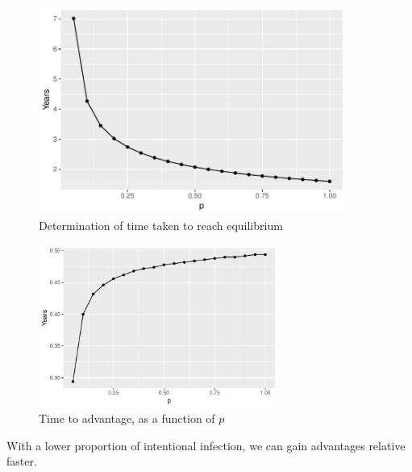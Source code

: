 \documentclass[12pt]{beamer}
\begin{document}
\begin{frame}
\begin{figure}[h]
  \centering
  \includegraphics[width=0.9\textwidth]{Figures/Time_to_EE_plot.pdf}
  \caption{Determination of time taken to reach equilibrium}
\end{figure}
\end{frame}
\begin{frame}
\begin{figure}[H]
  \centering
  \includegraphics[width=0.7\textwidth]{Figures/Time_to_advantage_plot.pdf}
  \caption{Time to advantage, as a function of $p$}
\end{figure}
With a lower proportion of intentional infection, we can gain advantages relative faster.
\end{frame}
\end{document}
